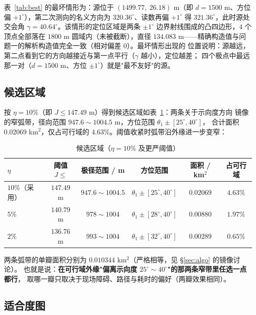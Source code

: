 表~\ref{tab:best} 的最坏情形为：源位于 $(1499.77,\;26.18)$ m（即 $d=1500$ m、方位偏
$+1^\circ$），第二次测向的名义方向为 $320.36^\circ$、读数再偏 $+1^\circ$ 得
$321.36^\circ$，此时源处交会角 $\gamma=40.64^\circ$。该情形的定位区域是两条 $\pm1^\circ$
边界射线围成的凸四边形，$4$ 个顶点全部落在 $1800$ m 圆域内（未被截断），直径
$134.083$ m——精确构造值与问题一的解析构造值完全一致（相对偏差 $0$）。最坏情形出现的
位置说明：源越远，第二点看到它的方向越接近与第一点平行（$\gamma$ 越小），定位越差；
四个极点中最远那一对（$d=1500$ m、方位 $\pm1^\circ$）就是"最不友好"的源。

\subsection{候选区域}

按 $\eta=10\%$（即 $J\le147.49$ m）得到候选区域如表~\ref{tab:band}：两条关于示向度方向
镜像的窄弧带，径向范围 $947.6\sim1004.5$ m，方位范围 $\theta_1\pm[25^\circ,40^\circ]$，
合计面积 $0.02069$ km$^2$，仅占可行域的 $4.63\%$。阈值收紧时弧带沿外缘进一步变窄：

\begin{table}[H]
  \centering
  \caption{候选区域（$\eta=10\%$ 及更严阈值）}
  \label{tab:band}
  \small
  \setlength{\tabcolsep}{4pt}
  \begin{tabular}{lccccc}
    \toprule
    $\eta$ & \textbf{阈值 $J\le$} & \textbf{极径范围 / m} & \textbf{方位范围} & \textbf{面积 / km$^2$} & \textbf{占可行域} \\
    \midrule
    $10\%$（采用） & $147.49$ m & $947.6\sim1004.5$ & $\theta_1\pm[25^\circ,40^\circ]$ & $0.02069$ & $4.63\%$ \\
    $5\%$          & $140.79$ m & $978\sim1004$     & $\theta_1\pm[28^\circ,40^\circ]$ & $0.00880$ & $1.97\%$ \\
    $2\%$          & $136.76$ m & $993\sim1004$     & $\theta_1\pm[32^\circ,40^\circ]$ & $0.00289$ & $0.65\%$ \\
    \bottomrule
  \end{tabular}
\end{table}

两条弧带的单瓣面积分别为 $0.010344$ km$^2$（严格相等，见 §\ref{sec:algo} 的镜像讨论）。
也就是说：\textbf{在可行域外缘"偏离示向度 $25^\circ\sim40^\circ$"的那两条窄带里任选一点都行}，
取哪一瓣只取决于现场障碍、路径与耗时的偏好（两瓣效果相同）。

\subsection{适合度图}

